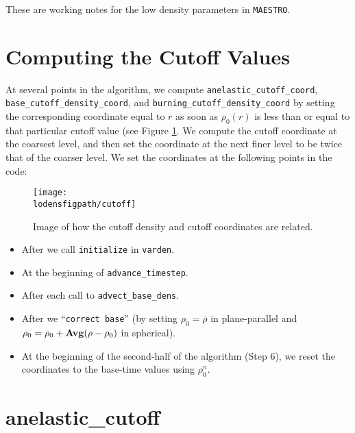 These are working notes for the low density parameters in {\tt MAESTRO}.

\section{Computing the Cutoff Values}

At several points in the algorithm, we compute {\tt anelastic\_cutoff\_coord}, 
{\tt base\_cutoff\_density\_coord}, and {\tt burning\_cutoff\_density\_coord} by 
setting the corresponding coordinate equal to $r$ as soon as $\rho_0(r)$ is less than 
or equal to that particular cutoff value (see Figure \ref{Fig:Cutoff}.
We compute the cutoff coordinate at the
coarsest level, and then set the coordinate at the next finer level to be twice that
of the coarser level.  We set the coordinates at the following points in the code:
\begin{figure}[hpb]
\centering
\texttt{[image: \\lodensfigpath/cutoff]}\hspace{0.2in}
\begin{minipage}[b]{5.0in}
\caption{Image of how the cutoff density and cutoff coordinates
are related.\vspace{2em}}
\end{minipage}
\label{Fig:Cutoff}
\end{figure}

\begin{itemize}

\item After we call {\tt initialize} in {\tt varden}.

\item At the beginning of {\tt advance\_timestep}.

\item After each call to {\tt advect\_base\_dens}.

\item After we ``{\tt correct base}'' (by setting $\rho_0 = \overline{\rho}$ in
  plane-parallel and $\rho_0 = \rho_0 + {\bf{Avg}}(\rho - \rho_0)$ in spherical).

\item At the beginning of the second-half of the algorithm (Step 6), we reset
  the coordinates to the base-time values using $\rho_0^n$.

\end{itemize}

\section{anelastic\_cutoff}\label{Sec:Anelastic Cutoff}

